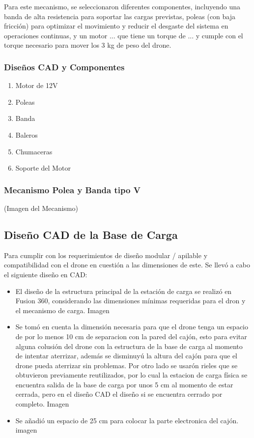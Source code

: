 Para este mecanismo, se seleccionaron diferentes componentes, incluyendo una banda de alta resistencia para soportar las cargas previstas, poleas (con baja fricción) para optimizar el movimiento y reducir el desgaste del sistema en operaciones continuas, y un motor ... que tiene un torque de ... y cumple con el torque necesario para mover los 3 kg de peso del drone.

\subsubsection{Diseños CAD y Componentes}
    \begin{enumerate}
        \item Motor de 12V
        \item Poleas
        \item Banda
        \item Baleros
        \item Chumaceras 
        \item Soporte del Motor
    \end{enumerate}

\subsubsection{Mecanismo Polea y Banda tipo V}
(Imagen del Mecanismo)

\subsection{Diseño CAD de la Base de Carga}
Para cumplir con los requerimientos de diseño modular / apilable y compatibilidad con el drone en cuestión a las dimensiones de este. Se llevó a cabo el siguiente diseño en CAD:

    \begin{itemize}
        \item     El diseño de la estructura principal de la estación de carga se realizó en Fusion 360, considerando las dimensiones mínimas requeridas para el dron y el mecanismo de carga.
        Imagen
        \item     Se tomó en cuenta la dimensión necesaria para que el drone tenga un espacio de por lo menos 10 cm de separacion con la pared del cajón, esto para evitar alguna colusión del drone con la estructura de la base de carga al momento de intentar aterrizar, además se disminuyú la altura del cajón para que el drone pueda aterrizar sin problemas. Por otro lado se usarón rieles que se obtuvieron previamente reutilizados, por lo cual la estacion de carga física se encuentra salida de la base de carga por unos 5 cm al momento de estar cerrada, pero en el diseño CAD el diseño si se encuentra cerrado por completo. 
        Imagen
        \item     Se añadió un espacio de 25 cm para colocar la parte electronica del cajón.
        imagen
    \end{itemize}

